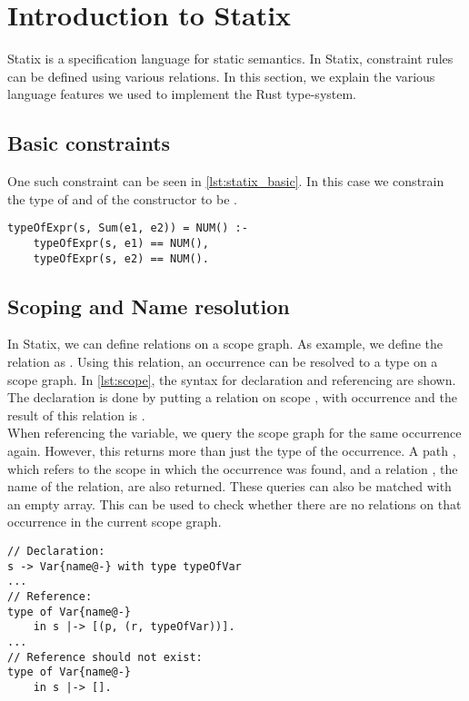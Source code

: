 \section{Introduction to Statix}\label{s:statix}
Statix is a specification language for static semantics. In Statix, constraint rules can be defined using various relations. In this section, we explain the various language features we used to implement the Rust type-system.

\subsection{Basic constraints} 
One such constraint can be seen in \autoref{lst:statix_basic}. In this case we constrain the type of  and  of the  constructor to be .  

 \begin{lstlisting}[showstringspaces=false, frame=single, escapechar=~, label={lst:statix_basic}, caption={Example of simple constraint rule}]
typeOfExpr(s, Sum(e1, e2)) = NUM() :- 
	typeOfExpr(s, e1) == NUM(),
	typeOfExpr(s, e2) == NUM().
  \end{lstlisting}
 
\subsection{Scoping and Name resolution}
In Statix, we can define relations on a scope graph. 
As example, we define the relation  as . Using this relation, an occurrence can be resolved to a type on a scope graph. In \autoref{lst:scope}, the syntax for declaration and referencing  are shown. The declaration is done by putting a relation on scope , with occurrence  and the result of this relation is . \\

When referencing the variable, we query the scope graph for the same occurrence again. However, this returns more than just the type of the occurrence. A path , which refers to the scope in which the occurrence was found, and a relation , the name of the relation, are also returned. These queries can also be matched with an empty array. This can be used to check whether there are no relations on that occurrence in the current scope graph. 

\begin{lstlisting}[showstringspaces=false, frame=single, escapechar=~, label={lst:scope}, caption={Declaring and resolving on a scope}]
// Declaration:
s -> Var{name@-} with type typeOfVar
...
// Reference: 
type of Var{name@-} 
    in s |-> [(p, (r, typeOfVar))].
...
// Reference should not exist:
type of Var{name@-} 
    in s |-> [].
\end{lstlisting}

